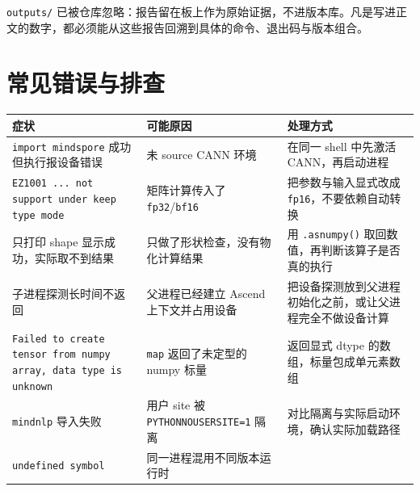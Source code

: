 \passthrough{\lstinline!outputs/!}
已被仓库忽略：报告留在板上作为原始证据，不进版本库。凡是写进正文的数字，都必须能从这些报告回溯到具体的命令、退出码与版本组合。

\section{常见错误与排查}\label{src-book-chapter5-h34}

\begin{longtable}[]{@{}
  >{\raggedright\arraybackslash}p{}
  >{\raggedright\arraybackslash}p{}
  >{\raggedright\arraybackslash}p{}@{}}
\toprule\noalign{}
\begin{minipage}[b]{\linewidth}\raggedright
症状
\end{minipage} & \begin{minipage}[b]{\linewidth}\raggedright
可能原因
\end{minipage} & \begin{minipage}[b]{\linewidth}\raggedright
处理方式
\end{minipage} \\
\midrule\noalign{}
\endhead
\bottomrule\noalign{}
\endlastfoot
\passthrough{\lstinline!import mindspore!} 成功但执行报设备错误 & 未
source CANN 环境 & 在同一 shell 中先激活 CANN，再启动进程 \\
\passthrough{\lstinline!EZ1001 ... not support under keep type mode!} &
矩阵计算传入了
\passthrough{\lstinline!fp32!}/\passthrough{\lstinline!bf16!} &
把参数与输入显式改成 \passthrough{\lstinline!fp16!}，不要依赖自动转换 \\
只打印 shape 显示成功，实际取不到结果 & 只做了形状检查，没有物化计算结果
& 用 \passthrough{\lstinline!.asnumpy()!}
取回数值，再判断该算子是否真的执行 \\
子进程探测长时间不返回 & 父进程已经建立 Ascend 上下文并占用设备 &
把设备探测放到父进程初始化之前，或让父进程完全不做设备计算 \\
\passthrough{\lstinline!Failed to create tensor from numpy array, data type is unknown!}
& \passthrough{\lstinline!map!} 返回了未定型的 numpy 标量 & 返回显式
dtype 的数组，标量包成单元素数组 \\
\passthrough{\lstinline!mindnlp!} 导入失败 & 用户 site 被
\passthrough{\lstinline!PYTHONNOUSERSITE=1!} 隔离 &
对比隔离与实际启动环境，确认实际加载路径 \\
\passthrough{\lstinline!undefined symbol!} & 同一进程混用不同版本运行时

\end{longtable}
